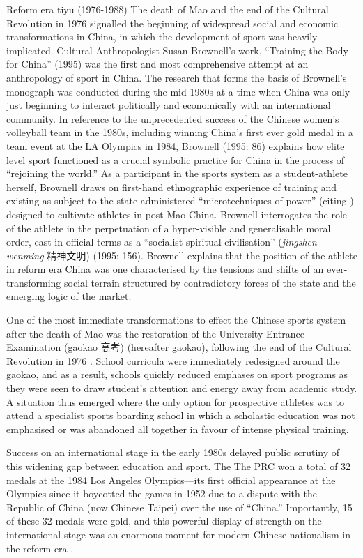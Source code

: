   Reform era tiyu (1976-1988)
  The death of Mao and the end of the Cultural Revolution in 1976 signalled the beginning of widespread social and economic transformations in China, in which the development of sport was heavily implicated.  Cultural Anthropologist Susan Brownell’s work, ``Training the Body for China'' (1995) was the first and most comprehensive attempt at an anthropology of sport in China. The research that forms the basis of Brownell's monograph was conducted during the mid 1980s at a time when China was only just beginning to interact politically and economically with an international community.  In reference to the unprecedented success of the Chinese women’s volleyball team in the 1980s, including winning China's first ever gold medal in a team event at the LA Olympics in 1984, Brownell (1995: 86) explains how elite level sport functioned as a crucial symbolic practice for China in the process of ``rejoining the world.''  As a participant in the sports system as a student-athlete herself, Brownell draws on first-hand ethnographic experience of training and existing as subject to the state-administered ``microtechniques of power'' (citing \cite{Foucault1977}) designed to cultivate athletes in post-Mao China.  Brownell interrogates the role of the athlete in the perpetuation of a hyper-visible and generalisable moral order, cast in official terms as a ``socialist spiritual civilisation'' (\textit{jingshen wenming} 精神文明) (1995: 156).  Brownell explains that the position of the athlete in reform era China was one characterised by the tensions and shifts of an ever-transforming social terrain structured by contradictory forces of the state and the emerging logic of the market.

  One of the most immediate transformations to effect the Chinese sports system after the death of Mao was the restoration of the University Entrance Examination (gaokao 高考)
  (hereafter gaokao), following the end of the Cultural Revolution in 1976 \citep[198]{Brownell1995}.  School curricula were immediately redesigned around the gaokao, and as a result, schools quickly reduced emphases on sport programs as they were seen to draw student’s attention and energy away from academic study.  A situation thus emerged where the only option for prospective athletes was to attend a specialist sports boarding school in which a scholastic education was not emphasised or was abandoned all together in favour of intense physical training.

  Success on an international stage in the early 1980s delayed public scrutiny of this widening gap between education and sport. The The PRC won a total of 32 medals at the 1984 Los Angeles Olympics---its first official appearance at the Olympics since it boycotted the games in 1952 due to a dispute with the Republic of China (now Chinese Taipei) over the use of ``China.''  Importantly, 15 of these 32 medals were gold, and this powerful display of strength on the international stage was an enormous moment for modern Chinese nationalism in the reform era \citep{Brownell2008}.


